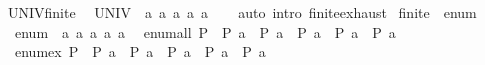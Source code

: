 \begin{isabellebody}
\isanewline
{}\isamarkupfalse%
\ UNIV{\isacharunderscore}{\kern0pt}finite{\isacharunderscore}{\kern0pt}{}{\isacharcolon}{\kern0pt}\isanewline
\ \ {\isachardoublequoteopen}UNIV\ {\isacharequal}{\kern0pt}\ {\isacharbraceleft}{\kern0pt}a\ a\ a\ a\ a\isanewline
%
\isadelimproof
\ \ %
\endisadelimproof
%
\isatagproof
{}\isamarkupfalse%
\ {\isacharparenleft}{\kern0pt}auto\ intro{\isacharcolon}{\kern0pt}\ finite{\isacharunderscore}{\kern0pt}{}{\isachardot}{\kern0pt}exhaust{\isacharparenright}{\kern0pt}%
\endisatagproof
{\isafoldproof}%
%
\isadelimproof
\isanewline
%
\endisadelimproof
\isanewline
{}\isamarkupfalse%
\ finite{\isacharunderscore}{\kern0pt}{}\ {\isacharcolon}{\kern0pt}{\isacharcolon}{\kern0pt}\ enum\isanewline
{}\isanewline
\isanewline
{}\isamarkupfalse%
\isanewline
\ \ {\isachardoublequoteopen}enum\ {\isacharequal}{\kern0pt}\ {\isacharbrackleft}{\kern0pt}a\ a\ a\ a\ a\isanewline
\isanewline
{}\isamarkupfalse%
\isanewline
\ \ {\isachardoublequoteopen}enum{\isacharunderscore}{\kern0pt}all\ P\ {\isasymlongleftrightarrow}\ P\ a\ {\isasymand}\ P\ a\ {\isasymand}\ P\ a\ {\isasymand}\ P\ a\ {\isasymand}\ P\ a\isanewline
\isanewline
{}\isamarkupfalse%
\isanewline
\ \ {\isachardoublequoteopen}enum{\isacharunderscore}{\kern0pt}ex\ P\ {\isasymlongleftrightarrow}\ P\ a\ {\isasymor}\ P\ a\ {\isasymor}\ P\ a\ {\isasymor}\ P\ a\ {\isasymor}\ P\ a\isanewline
\isanewline
{}\isamarkupfalse%
%
\isadelimproof
\ %
\endisadelimproof
%
\isatagproof
{}\isamarkupfalse%
\isanewline
{}\isamarkupfalse%

\end{isabellebody}
